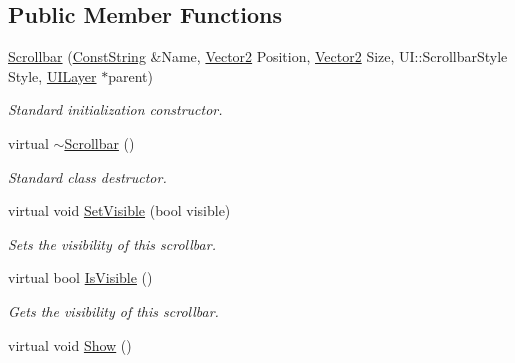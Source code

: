 \subsection*{Public Member Functions}
\begin{DoxyCompactItemize}
\item 
\hyperlink{classphys_1_1UI_1_1Scrollbar_aae98f65b64005d700e9bbf06f9a07102}{Scrollbar} (\hyperlink{namespacephys_a5ce5049f8b4bf88d6413c47b504ebb31}{ConstString} \&Name, \hyperlink{classphys_1_1Vector2}{Vector2} Position, \hyperlink{classphys_1_1Vector2}{Vector2} Size, UI::ScrollbarStyle Style, \hyperlink{classphys_1_1UILayer}{UILayer} $\ast$parent)
\begin{DoxyCompactList}\small\item\em Standard initialization constructor. \item\end{DoxyCompactList}\item 
\hypertarget{classphys_1_1UI_1_1Scrollbar_af9fb189c7856353a930c0a228fc0cf42}{
virtual \hyperlink{classphys_1_1UI_1_1Scrollbar_af9fb189c7856353a930c0a228fc0cf42}{$\sim$Scrollbar} ()}
\label{d0/d3e/classphys_1_1UI_1_1Scrollbar_af9fb189c7856353a930c0a228fc0cf42}

\begin{DoxyCompactList}\small\item\em Standard class destructor. \item\end{DoxyCompactList}\item 
virtual void \hyperlink{classphys_1_1UI_1_1Scrollbar_a2d8997e0bbbb1c17af5128fea98fb1e4}{SetVisible} (bool visible)
\begin{DoxyCompactList}\small\item\em Sets the visibility of this scrollbar. \item\end{DoxyCompactList}\item 
virtual bool \hyperlink{classphys_1_1UI_1_1Scrollbar_a213c946ccadd3b689f59e2761a1d1848}{IsVisible} ()
\begin{DoxyCompactList}\small\item\em Gets the visibility of this scrollbar. \item\end{DoxyCompactList}\item 
\hypertarget{classphys_1_1UI_1_1Scrollbar_a42955ae0e2b273ca9ea392a8dbc62604}{
virtual void \hyperlink{classphys_1_1UI_1_1Scrollbar_a42955ae0e2b273ca9ea392a8dbc62604}{Show} ()}
\label{d0/d3e/classphys_1_1UI_1_1Scrollbar_a42955ae0e2b273ca9ea392a8dbc62604}


\end{DoxyCompactItemize}
